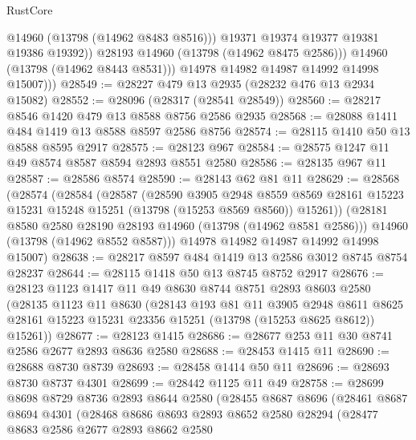 \begin{lexlean}{RustCore}
\begin{coremodule}
                    @14960
                    (@13798 (@14962 @8483 @8516)))
                  @19371
                  @19374
                  @19377
                  @19381
                  @19386
                  @19392))
              @28193
              @14960
              (@13798 (@14962 @8475 @2586)))
            @14960
            (@13798 (@14962 @8443 @8531)))
          @14978
          @14982
          @14987
          @14992
          @14998
          @15007)))
@28549 := @28227 @479 @13 @2935 (@28232 @476 @13 @2934 @15082)
@28552 := @28096 (@28317 (@28541 @28549))
@28560 := @28217 @8546 @1420 @479 @13 @8588 @8756 @2586 @2935
@28568 := @28088 @1411 @484 @1419 @13 @8588 @8597 @2586 @8756
@28574 := @28115 @1410 @50 @13 @8588 @8595 @2917
@28575 := @28123 @967
@28584 := @28575 @1247 @11 @49 @8574 @8587 @8594 @2893 @8551 @2580
@28586 := @28135 @967 @11
@28587 := @28586 @8574
@28590 := @28143 @62 @81 @11
@28629 := @28568
    (@28574
      (@28584
        (@28587
          (@28590
            @3905
            @2948
            @8559
            @8569
            @28161
            @15223
            @15231
            @15248
            @15251
            (@13798 (@15253 @8569 @8560))
            @15261))
        (@28181 @8580 @2580 @28190 @28193 @14960 (@13798 (@14962 @8581 @2586)))
        @14960
        (@13798 (@14962 @8552 @8587)))
      @14978
      @14982
      @14987
      @14992
      @14998
      @15007)
@28638 := @28217 @8597 @484 @1419 @13 @2586 @3012 @8745 @8754 @28237
@28644 := @28115 @1418 @50 @13 @8745 @8752 @2917
@28676 := @28123
    @1123
    @1417
    @11
    @49
    @8630
    @8744
    @8751
    @2893
    @8603
    @2580
    (@28135
      @1123
      @11
      @8630
      (@28143
        @193
        @81
        @11
        @3905
        @2948
        @8611
        @8625
        @28161
        @15223
        @15231
        @23356
        @15251
        (@13798 (@15253 @8625 @8612))
        @15261))
@28677 := @28123 @1415
@28686 := @28677 @253 @11 @30 @8741 @2586 @2677 @2893 @8636 @2580
@28688 := @28453 @1415 @11
@28690 := @28688 @8730 @8739
@28693 := @28458 @1414 @50 @11
@28696 := @28693 @8730 @8737 @4301
@28699 := @28442 @1125 @11 @49
@28758 := @28699
    @8698
    @8729
    @8736
    @2893
    @8644
    @2580
    (@28455
      @8687
      @8696
      (@28461
        @8687
        @8694
        @4301
        (@28468
          @8686
          @8693
          @2893
          @8652
          @2580
          @28294
          (@28477
            @8683
            @2586
            @2677
            @2893
            @8662
            @2580

\end{coremodule}
\end{lexlean}
